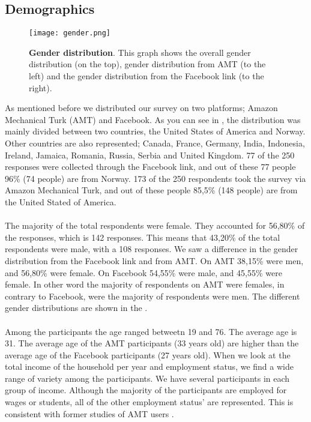 \subsection{Demographics}

\begin{figure}[h!]
\centering
\texttt{[image: gender.png]}
\caption[Gender distribution]{\textbf{Gender distribution}. This graph shows the overall gender distribution (on the top), gender distribution from AMT (to the left) and the gender distribution from the Facebook link (to the right).} 
\label{fig:gender}
\end{figure}

As mentioned before we distributed our survey on two platforms; Amazon Mechanical Turk (AMT) and Facebook. As you can see in , the distribution was mainly divided between two countries, the United States of America and Norway. Other countries are also represented; Canada, France, Germany, India, Indonesia, Ireland, Jamaica, Romania, Russia, Serbia and United Kingdom. 77 of the 250 responses were collected through the Facebook link, and out of these 77 people 96\% (74 people) are from Norway. 173 of the 250 respondents took the survey via Amazon Mechanical Turk, and out of these people 85,5\% (148 people) are from the United Stated of America. 

\paragraph{}
The majority of the total respondents were female. They accounted for 56,80\% of the responses, which is 142 responses. This means that 43,20\% of the total respondents were male, with a 108 responses. We saw a difference in the gender distribution from the Facebook link and from AMT. On AMT 38,15\% were men, and 56,80\% were female. On Facebook 54,55\% were male, and 45,55\% were female. In other word the majority of respondents on AMT were females, in contrary to Facebook, were the majority of respondents were men. The different gender distributions are shown in the .
 
\paragraph{}
Among the participants the age ranged betweetn 19 and 76. The average age is 31. The average age of the AMT participants (33 years old) are higher than the average age of the Facebook participants (27 years old). When we look at the total income of the household per year and employment status, we find a wide range of variety among the participants. We have several participants in each group of income. Although the majority of the participants are employed for wages or students, all of the other employment status' are represented. This is consistent with former studies of AMT users \cite{incentivesAmt}. 


